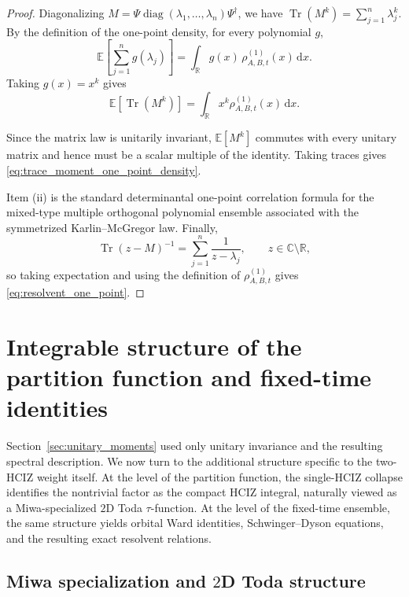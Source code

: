 \documentclass[11pt,a4paper]{article}
\theoremstyle{definition}\newtheorem{definition}[theorem]{Definition}
\theoremstyle{remark}\newtheorem{remark}[theorem]{Remark}
\numberwithin{equation}{section}
\DeclareMathOperator{\Tr}{Tr}
\DeclareMathOperator{\diag}{diag}
\newcommand{\R}{\mathbb{R}}
\newcommand{\C}{\mathbb{C}}
\newcommand{\dd}{\mathrm{d}}
\newcommand{\EE}{\mathbb{E}}
\begin{document}
\begin{proof}
Diagonalizing $M=\Psi \diag(\lambda_1,\dots,\lambda_n)\Psi^\dagger$, we have $\Tr(M^k)=\sum_{j=1}^n \lambda_j^k$. By the definition of the one-point density, for every polynomial $g$,
\begin{equation}
\EE\!\left[\sum_{j=1}^n g(\lambda_j)\right]
=
\int_{\R} g(x)\,\rho^{(1)}_{A,B,t}(x)\,\dd x.
\end{equation}
Taking $g(x)=x^k$ gives
\begin{equation}
\EE[\Tr(M^k)]
=
\int_{\R} x^k \rho^{(1)}_{A,B,t}(x)\,\dd x.
\end{equation}

Since the matrix law is unitarily invariant, $\EE[M^k]$ commutes with every unitary matrix and hence must be a scalar multiple of the identity. Taking traces gives \eqref{eq:trace_moment_one_point_density}.

Item \textup{(ii)} is the standard determinantal one-point correlation formula for the mixed-type multiple orthogonal polynomial ensemble associated with the symmetrized Karlin--McGregor law. Finally,
\begin{equation}
\Tr(z-M)^{-1}=\sum_{j=1}^n \frac1{z-\lambda_j},
\qquad z\in\C\setminus\R,
\end{equation}
so taking expectation and using the definition of $\rho^{(1)}_{A,B,t}$ gives \eqref{eq:resolvent_one_point}.
\end{proof}


\section{Integrable structure of the partition function and fixed-time identities}
\label{sec:integrable}

Section~\ref{sec:unitary_moments} used only unitary invariance and the resulting spectral description. We now turn to the additional structure specific to the two-HCIZ weight itself. At the level of the partition function, the single-HCIZ collapse identifies the nontrivial factor as the compact HCIZ integral, naturally viewed as a Miwa-specialized $2$D Toda $\tau$-function. At the level of the fixed-time ensemble, the same structure yields orbital Ward identities, Schwinger--Dyson equations, and the resulting exact resolvent relations.
 
 

\subsection{Miwa specialization and $2$D Toda structure}
\end{document}
